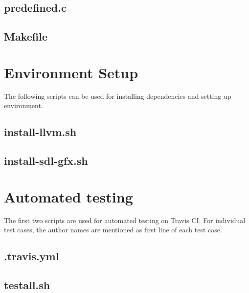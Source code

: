 \documentclass[letterpaper,12pt]{article}
\begin{document}
\begin{appendices}
    \subsection{predefined.c}
    

    \subsection{Makefile}
    


\section{Environment Setup}

The following scripts can be used for installing dependencies and setting up environment.

    \subsection{install-llvm.sh}
    

    \subsection{install-sdl-gfx.sh}
    

\section{Automated testing}

The first two scripts are used for automated testing on Travis CI. For individual test cases, the author names are mentioned as first line of each test case.

    \subsection{.travis.yml}
    

    \subsection{testall.sh}
    

    
\end{appendices}
\end{document}
